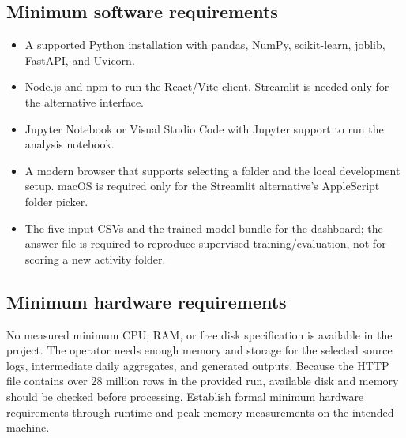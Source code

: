 \documentclass[12pt,a4paper,oneside]{report}
\begin{document}
\subsection{Minimum software requirements}
\begin{itemize}
  \item A supported Python installation with pandas, NumPy,
        scikit-learn, joblib, FastAPI, and Uvicorn.
  \item Node.js and npm to run the React/Vite client. Streamlit is
        needed only for the alternative interface.
  \item Jupyter Notebook or Visual Studio Code with Jupyter support to
        run the analysis notebook.
  \item A modern browser that supports selecting a folder and the local
        development setup. macOS is required only for the Streamlit
        alternative's AppleScript folder picker.
  \item The five input CSVs and the trained model bundle for the
        dashboard; the answer file is required to reproduce supervised
        training/evaluation, not for scoring a new activity folder.
\end{itemize}

\subsection{Minimum hardware requirements}
No measured minimum CPU, RAM, or free disk specification is available in
the project. The operator needs enough memory and storage for the
selected source logs, intermediate daily aggregates, and generated
outputs. Because the HTTP file contains over 28 million rows in the
provided run, available disk and memory should be checked before
processing. Establish formal minimum hardware requirements through
runtime and peak-memory measurements on the intended machine.
\end{document}
